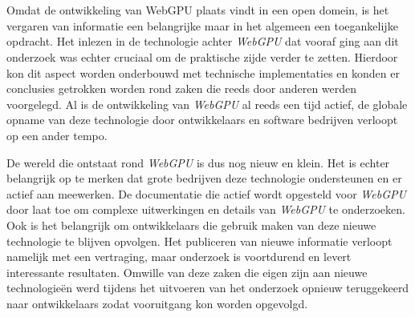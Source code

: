 
\chapter{}%
\label{ch:methodologie}


Omdat de ontwikkeling van WebGPU plaats vindt in een open domein, is het vergaren van informatie een belangrijke maar in het algemeen een toegankelijke opdracht. Het inlezen in de technologie achter \textit{WebGPU} dat vooraf ging aan dit onderzoek was echter cruciaal om de praktische zijde verder te zetten. Hierdoor kon dit aspect worden onderbouwd met technische implementaties en konden er conclusies getrokken worden rond zaken die reeds door anderen werden voorgelegd. Al is de ontwikkeling van \textit{WebGPU} al reeds een tijd actief, de globale opname van deze technologie door ontwikkelaars en software bedrijven verloopt op een ander tempo. 

\bigbreak{}

De wereld die ontstaat rond \textit{WebGPU} is dus nog nieuw en klein. Het is echter belangrijk op te merken dat grote bedrijven deze technologie ondersteunen en er actief aan meewerken. De documentatie die actief wordt opgesteld voor \textit{WebGPU} door \textcite{W3C2023} laat toe om complexe uitwerkingen en details van \textit{WebGPU} te onderzoeken. Ook is het belangrijk om ontwikkelaars die gebruik maken van deze nieuwe technologie te blijven opvolgen. Het publiceren van nieuwe informatie verloopt namelijk met een vertraging, maar onderzoek is voortdurend en levert interessante resultaten. Omwille van deze zaken die eigen zijn aan nieuwe technologieën werd tijdens het uitvoeren van het onderzoek opnieuw teruggekeerd naar ontwikkelaars zodat vooruitgang kon worden opgevolgd.

